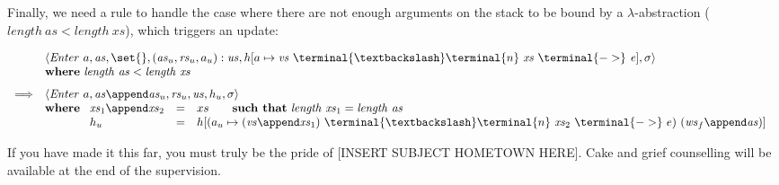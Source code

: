 \documentclass[10pt,a4paper]{exam} %
\begin{document}
Finally, we need a rule to handle the case where there are not enough arguments on the stack to be bound by a $\lambda$-abstraction ($\mathit{length}~\mathit{as} < \mathit{length}~\mathit{xs}$), which triggers an update:
\begin{mdframed}
\begin{equation}
\begin{array}{cl}
 & \langle \mathit{Enter}~a, \mathit{as}, \set{}, (\mathit{as}_u, \mathit{rs}_u, a_u) : \mathit{us}, h[a \mapsto \mathit{vs}~\terminal{\textbackslash}\terminal{n}~\mathit{xs}~\terminal{->}~\mathit{e}], \sigma \rangle \\
 & \mathbf{where}~\mathit{length}~\mathit{as} < \mathit{length}~\mathit{xs}\\[0.25cm]
\Longrightarrow & \langle \mathit{Enter}~a, \mathit{as} \append \mathit{as}_u, \mathit{rs}_u, \mathit{us}, h_u, \sigma \rangle \\
 & \mathbf{where}~\begin{array}[t]{lcl}
 \mathit{xs}_1 \append \mathit{xs}_2 & = & xs \qquad \textbf{such that}~\mathit{length}~\mathit{xs}_1 = \mathit{length}~\mathit{as} \\
 h_u & = & h[(a_u \mapsto (\mathit{vs} \append \mathit{xs}_1)~\terminal{\textbackslash}\terminal{n}~\mathit{xs}_2~\terminal{->}~e)~(\mathit{ws}_f \append \mathit{as})]
 \end{array}
\end{array}
\end{equation}
\end{mdframed}

{\tiny If you have made it this far, you must truly be the pride of [INSERT SUBJECT HOMETOWN HERE]. Cake and grief counselling will be available at the end of the supervision.}
\end{document}
